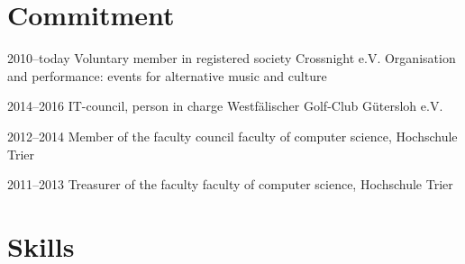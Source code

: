 \documentclass[]{friggeri-cv} %
\begin{document}
\pagebreak


\section{Commitment}

\begin{entrylist}
	
	
	\entry
	{2010--today}
	{Voluntary member in registered society Crossnight e.V.}
	{}
	{Organisation and performance: events for alternative music and culture}
	
	\entry
	{2014--2016}
	{IT-council, person in charge}
	{}
	{Westf\"{a}lischer Golf-Club G\"{u}tersloh e.V.}
	
	
	
	\entry
	{2012--2014}
	{Member of the faculty council}
	{}
	{faculty of computer science, Hochschule Trier}
	
	
	\entry
	{2011--2013}
	{Treasurer of the faculty}
	{}
	{faculty of computer science, Hochschule Trier}
	
	
	
\end{entrylist}


\section{Skills}
\end{document}
